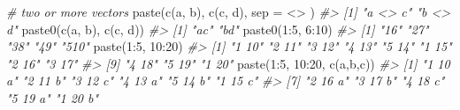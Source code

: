 \documentclass[
]{book}
\newenvironment{Shaded}{\begin{snugshade}}{\end{snugshade}}
\newcommand{\AttributeTok}[1]{\textcolor[rgb]{0.77,0.63,0.00}{#1}}
\newcommand{\CommentTok}[1]{\textcolor[rgb]{0.56,0.35,0.01}{\textit{#1}}}
\newcommand{\DecValTok}[1]{\textcolor[rgb]{0.00,0.00,0.81}{#1}}
\newcommand{\FunctionTok}[1]{\textcolor[rgb]{0.00,0.00,0.00}{#1}}
\newcommand{\NormalTok}[1]{#1}
\newcommand{\SpecialCharTok}[1]{\textcolor[rgb]{0.00,0.00,0.00}{#1}}
\newcommand{\StringTok}[1]{\textcolor[rgb]{0.31,0.60,0.02}{#1}}
\begin{document}
\begin{Shaded}
\begin{Highlighting}[]
\CommentTok{\# two or more vectors}
\FunctionTok{paste}\NormalTok{(}\FunctionTok{c}\NormalTok{(}\StringTok{\textquotesingle{}a\textquotesingle{}}\NormalTok{, }\StringTok{\textquotesingle{}b\textquotesingle{}}\NormalTok{), }\FunctionTok{c}\NormalTok{(}\StringTok{\textquotesingle{}c\textquotesingle{}}\NormalTok{, }\StringTok{\textquotesingle{}d\textquotesingle{}}\NormalTok{), }\AttributeTok{sep =} \StringTok{\textquotesingle{} \textless{}\textgreater{} \textquotesingle{}}\NormalTok{)}
\CommentTok{\#\textgreater{} [1] "a \textless{}\textgreater{} c" "b \textless{}\textgreater{} d"}
\FunctionTok{paste0}\NormalTok{(}\FunctionTok{c}\NormalTok{(}\StringTok{\textquotesingle{}a\textquotesingle{}}\NormalTok{, }\StringTok{\textquotesingle{}b\textquotesingle{}}\NormalTok{), }\FunctionTok{c}\NormalTok{(}\StringTok{\textquotesingle{}c\textquotesingle{}}\NormalTok{, }\StringTok{\textquotesingle{}d\textquotesingle{}}\NormalTok{))}
\CommentTok{\#\textgreater{} [1] "ac" "bd"}
\FunctionTok{paste0}\NormalTok{(}\DecValTok{1}\SpecialCharTok{:}\DecValTok{5}\NormalTok{, }\DecValTok{6}\SpecialCharTok{:}\DecValTok{10}\NormalTok{)}
\CommentTok{\#\textgreater{} [1] "16"  "27"  "38"  "49"  "510"}
\FunctionTok{paste}\NormalTok{(}\DecValTok{1}\SpecialCharTok{:}\DecValTok{5}\NormalTok{, }\DecValTok{10}\SpecialCharTok{:}\DecValTok{20}\NormalTok{)}
\CommentTok{\#\textgreater{}  [1] "1 10" "2 11" "3 12" "4 13" "5 14" "1 15" "2 16" "3 17"}
\CommentTok{\#\textgreater{}  [9] "4 18" "5 19" "1 20"}
\FunctionTok{paste}\NormalTok{(}\DecValTok{1}\SpecialCharTok{:}\DecValTok{5}\NormalTok{, }\DecValTok{10}\SpecialCharTok{:}\DecValTok{20}\NormalTok{, }\FunctionTok{c}\NormalTok{(}\StringTok{\textquotesingle{}a\textquotesingle{}}\NormalTok{,}\StringTok{\textquotesingle{}b\textquotesingle{}}\NormalTok{,}\StringTok{\textquotesingle{}c\textquotesingle{}}\NormalTok{))}
\CommentTok{\#\textgreater{}  [1] "1 10 a" "2 11 b" "3 12 c" "4 13 a" "5 14 b" "1 15 c"}
\CommentTok{\#\textgreater{}  [7] "2 16 a" "3 17 b" "4 18 c" "5 19 a" "1 20 b"}


\end{Highlighting}
\end{Shaded}
\end{document}
